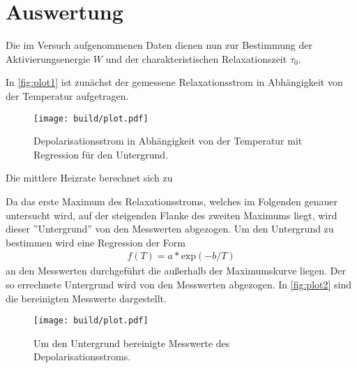 \section{Auswertung}
\label{sec:Auswertung}

Die im Versuch aufgenommenen Daten dienen nun zur Bestimmung der Aktivierungsenergie $W$ und der charakteristischen Relaxationszeit $\tau_0$.

In \autoref{fig:plot1} ist zunächst der gemessene Relaxationsstrom in Abhängigkeit von der Temperatur aufgetragen.

\begin{figure}[H]
  \centering
  \texttt{[image: build/plot.pdf]}
  \caption{Depolarisationsstrom in Abhängigkeit von der Temperatur mit Regression für den Untergrund.}
  \label{fig:plot1}
\end{figure}

Die mittlere Heizrate berechnet sich zu

Da das erste Maximum des Relaxationsstroms, welches im Folgenden genauer
untersucht wird, auf der steigenden Flanke des zweiten Maximums liegt, wird dieser
”Untergrund” von den Messwerten abgezogen.
Um den Untergrund zu bestimmen wird eine Regression der Form
\begin{align*}
  f(T)= a * \text{exp}(-b/T)
\end{align*}
an den Messwerten durchgeführt die außerhalb der Maximumskurve liegen.
Der so errechnete Untergrund wird von den Messwerten abgezogen.
In \autoref{fig:plot2} sind die bereinigten Messwerte dargestellt.

\begin{figure}[H]
  \centering
  \texttt{[image: build/plot.pdf]}
  \caption{Um den Untergrund bereinigte Messwerte des Depolarisationsstroms.}
  \label{fig:plot2}
\end{figure}


